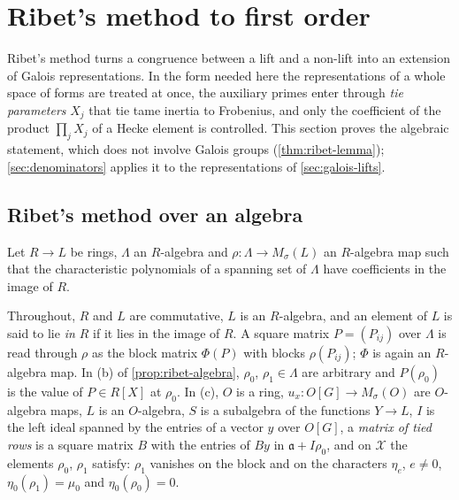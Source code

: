 \section{Ribet's method to first order}\label{sec:ribet}

Ribet's method \cite{Ribet1976,Wiles1990} turns a congruence between a lift and a non-lift into an extension of Galois representations. In the form needed here the representations of a whole
space of forms are treated at once, the auxiliary primes enter through \emph{tie parameters} $X_j$ that tie tame inertia to Frobenius, and only the coefficient of the
product $\prod_jX_j$ of a Hecke element is controlled. This section proves the algebraic statement, which does not involve Galois groups
(\cref{thm:ribet-lemma}); \cref{sec:denominators} applies it to the representations of \cref{sec:galois-lifts}.

\subsection{Ribet's method over an algebra}\label{ss:ribet-algebra}
Let $R\to L$ be rings, $\Lambda$ an $R$-algebra and $\rho\colon\Lambda\to M_\sigma(L)$ an $R$-algebra map such that the characteristic polynomials of a spanning set of $\Lambda$ have coefficients in the image of $R$.

Throughout, $R$ and $L$ are commutative, $L$ is an $R$-algebra, and an element of $L$ is said to lie \emph{in $R$} if it lies in the image of $R$. A square matrix $P=(P_{ij})$ over $\Lambda$ is read through $\rho$ as the block matrix $\Phi(P)$ with blocks
$\rho(P_{ij})$; $\Phi$ is again an $R$-algebra map. In (b) of \cref{prop:ribet-algebra}, $\rho_0$, $\rho_1\in\Lambda$ are arbitrary and $P(\rho_0)$ is the value of $P\in R[X]$ at $\rho_0$. In (c), $O$ is a ring, $u_x\colon O[G]\to M_\sigma(O)$
are $O$-algebra maps, $L$ is an $O$-algebra, $S$ is a subalgebra of the functions $Y\to L$, $I$ is the left ideal spanned by the entries of a vector $y$ over $O[G]$, a \emph{matrix of tied rows} is a square matrix $B$ with
the entries of $By$ in $\mathfrak a+I\rho_0$, and on $\mathcal X$ the elements $\rho_0$, $\rho_1$ satisfy: $\rho_1$ vanishes on the block and on the characters $\eta_e$, $e\ne0$, $\eta_0(\rho_1)=\mu_0$ and $\eta_0(\rho_0)=0$.

